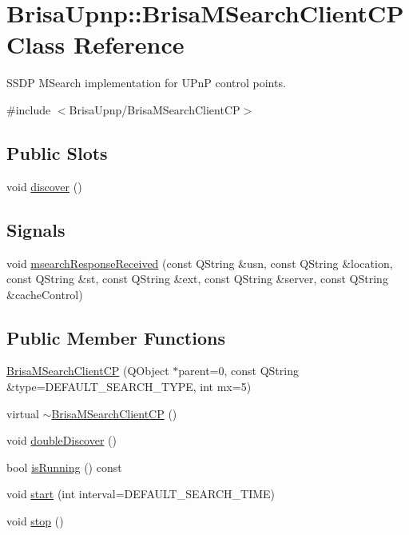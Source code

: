\hypertarget{classBrisaUpnp_1_1BrisaMSearchClientCP}{
\section{BrisaUpnp::BrisaMSearchClientCP Class Reference}
\label{classBrisaUpnp_1_1BrisaMSearchClientCP}
}


SSDP MSearch implementation for UPnP control points.  


{\ttfamily \#include $<$BrisaUpnp/BrisaMSearchClientCP$>$}\subsection*{Public Slots}
\begin{DoxyCompactItemize}
\item 
void \hyperlink{classBrisaUpnp_1_1BrisaMSearchClientCP_ade684c9716da9485cfa2027be173a29c}{discover} ()
\end{DoxyCompactItemize}
\subsection*{Signals}
\begin{DoxyCompactItemize}
\item 
void \hyperlink{classBrisaUpnp_1_1BrisaMSearchClientCP_abebd58a64a0cb18679d40ce2e0ca76a2}{msearchResponseReceived} (const QString \&usn, const QString \&location, const QString \&st, const QString \&ext, const QString \&server, const QString \&cacheControl)
\end{DoxyCompactItemize}
\subsection*{Public Member Functions}
\begin{DoxyCompactItemize}
\item 
\hyperlink{classBrisaUpnp_1_1BrisaMSearchClientCP_af2b7857c157d23ebe127ef44f64cce67}{BrisaMSearchClientCP} (QObject $\ast$parent=0, const QString \&type=DEFAULT\_\-SEARCH\_\-TYPE, int mx=5)
\item 
virtual \hyperlink{classBrisaUpnp_1_1BrisaMSearchClientCP_a6d337525aebcfd7a769905e4e28322ff}{$\sim$BrisaMSearchClientCP} ()
\item 
void \hyperlink{classBrisaUpnp_1_1BrisaMSearchClientCP_acfed2d3bba45be386220e6260bdec322}{doubleDiscover} ()
\item 
bool \hyperlink{classBrisaUpnp_1_1BrisaMSearchClientCP_a2fe779dccea96c7df6acc5a82b4b79fd}{isRunning} () const 
\item 
void \hyperlink{classBrisaUpnp_1_1BrisaMSearchClientCP_a6b1b90d6f85a8fac4f90166c45524a26}{start} (int interval=DEFAULT\_\-SEARCH\_\-TIME)
\item 
void \hyperlink{classBrisaUpnp_1_1BrisaMSearchClientCP_af56138f5ec0f25a51662888132eef28e}{stop} ()
\end{DoxyCompactItemize}


